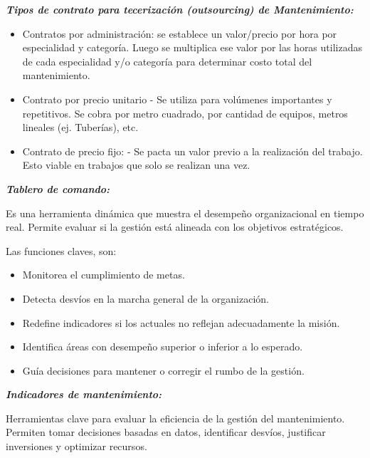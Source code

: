 \documentclass[a4paper,oneside,11pt]{article}
\begin{document}
\textbf{\textit{Tipos de contrato para tecerización (outsourcing) de Mantenimiento:}}

\begin{itemize}
    \item Contratos por administración: se establece un valor/precio por hora por especialidad y categoría. Luego se multiplica ese valor por las horas utilizadas de cada especialidad y/o categoría para determinar costo total del mantenimiento.
    \item Contrato por precio unitario - Se utiliza para volúmenes importantes y repetitivos. Se cobra por metro cuadrado, por cantidad de equipos, metros lineales (ej. Tuberías), etc. 
    \item Contrato de precio fijo: - Se pacta un valor previo a la realización del trabajo. Esto viable en trabajos que solo se realizan una vez.
\end{itemize}

\textbf{\textit{Tablero de comando:}}

Es una herramienta dinámica que muestra el desempeño organizacional en tiempo real. Permite evaluar si la gestión está alineada con los objetivos estratégicos.

Las funciones claves, son: 
\begin{itemize}
    \item Monitorea el cumplimiento de metas.
    \item Detecta desvíos en la marcha general de la organización.
    \item Redefine indicadores si los actuales no reflejan adecuadamente la misión.
    \item Identifica áreas con desempeño superior o inferior a lo esperado.
    \item Guía decisiones para mantener o corregir el rumbo de la gestión.
\end{itemize}

\textbf{\textit{Indicadores de mantenimiento:}}

Herramientas clave para evaluar la eficiencia de la gestión del mantenimiento.
Permiten tomar decisiones basadas en datos, identificar desvíos, justificar inversiones y optimizar recursos.
\end{document}

